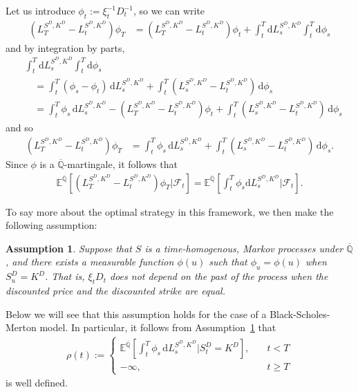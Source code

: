 \documentclass[a4paper]{amsart}
\newtheorem{assumption}[theorem]{Assumption}
\theoremstyle{definition}
\theoremstyle{remark}
\numberwithin{equation}{section}
\newcommand{\E}{\mathbb{E}}
\newcommand{\di}{\mathrm{d}}
\newcommand{\Fc}{\mathcal{F}}
\newcommand{\Ebq}[1]{\E^{\bQ}\left[#1\right]}
\newcommand{\ol}{\overline}
\newcommand{\bQ}{\ol{\mathbb{Q}}}
\begin{document}
Let us introduce $\phi_t := \xi_t^{-1} D_t^{-1}$, so we can write 
\begin{align*}
  \left(L_{T}^{S^D,K^D}-L_t^{S^D,K^D}\right) \phi_T
  & = \left(L_{T}^{S^D,K^D}-L_t^{S^D,K^D}\right) \phi_t  + \int_t^T  \di L_s^{S^D,K^D} \int_t^T \di \phi_s
\end{align*} 
and by integration by parts,
\begin{align*}
  & \int_t^T  \di L_s^{S^D,K^D} \int_t^T \di \phi_s\\
  & \quad = \int_t^T (\phi_s-\phi_t) \,\di L_s^{S^D,K^D} + \int_t^T \left(L_{s}^{S^D,K^D}-L_t^{S^D,K^D}\right)\, \di\phi_s\\
  & \quad = \int_t^T\phi_s\, \di L_s^{S^D,K^D} - \left(L_{T}^{S^D,K^D}-L_t^{S^D,K^D}\right) \phi_t
    + \int_t^T \left(L_{s}^{S^D,K^D}-L_t^{S^D,K^D}\right) \,\di \phi_s
\end{align*}
and so 
\begin{align*}
  \left(L_{T}^{S^D,K^D}-L_t^{S^D,K^D}\right) \phi_T
  & = \int_t^T \phi_s\, \di L_s^{S^D,K^D} + \int_t^T \left(L_{s}^{S^D,K^D}-L_t^{S^D,K^D}\right) \,\di\phi_s.
\end{align*}
Since $\phi$ is a $\bQ$-martingale, it follows that 
\begin{align*}
    \Ebq{\left(L_{T}^{S^D,K^D}-L_t^{S^D,K^D}\right)\phi_T |\Fc_t} = \Ebq{\int_t^T\phi_s \di L_s^{S^D,K^D}|\Fc_t}.  
\end{align*}

To say more about the optimal strategy in this framework, we then make the following  assumption:
\begin{assumption} \label{ass:barrier_markov}
  Suppose that $S$ is a time-homogenous, Markov processes under $\bQ$, and there exists a measurable function $\phi(u)$ such that $\phi_u = \phi(u)$ when $S_u^D = K^D$.  That is, $\xi_tD_t$ does not depend on the past of the process when the discounted price and the discounted strike are equal.
\end{assumption}
Below we will see that this assumption holds for the case of a
Black-Scholes-Merton model. In particular, it follows from Assumption~\ref{ass:barrier_markov} that
\begin{align*}
  \rho(t) :=
  \begin{cases}
    \Ebq{\int_t^T \phi_s \, \di L_s^{S^D,K^D} | S_t^D = K^D}, \quad & t < T\\
    -\infty, & t \ge T
  \end{cases}
\end{align*}
is well defined.
\end{document}
